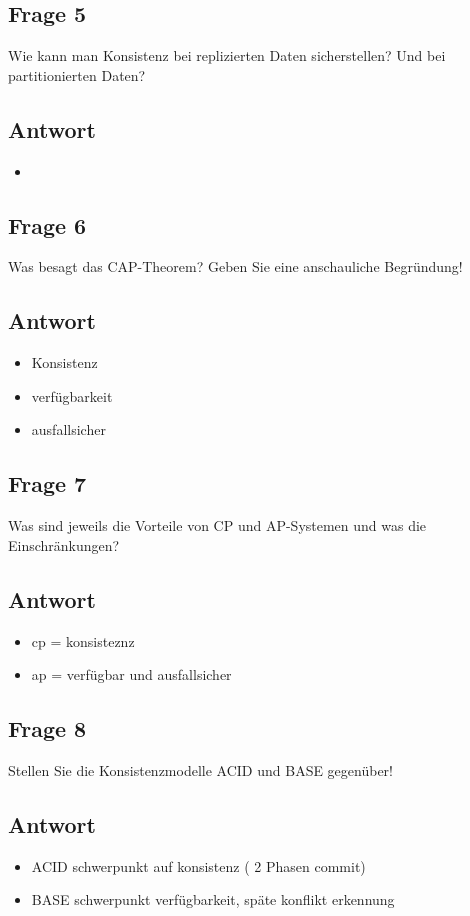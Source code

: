 \subsection*{Frage 5}
Wie kann man Konsistenz bei replizierten Daten sicherstellen? Und bei partitionierten Daten?
\subsection*{Antwort}
\begin{itemize}
	\item 
\end{itemize}
\subsection*{Frage 6}
Was besagt das CAP-Theorem? Geben Sie eine anschauliche Begründung!
\subsection*{Antwort}
\begin{itemize}
	\item Konsistenz
	\item verfügbarkeit
	\item ausfallsicher
\end{itemize}
\subsection*{Frage 7}
Was sind jeweils die Vorteile von CP und AP-Systemen und was die Einschränkungen?
\subsection*{Antwort}
\begin{itemize}
	\item cp = konsisteznz
	\item ap = verfügbar und ausfallsicher
\end{itemize}
\subsection*{Frage 8}
Stellen Sie die Konsistenzmodelle ACID und BASE gegenüber!
\subsection*{Antwort}
\begin{itemize}
	\item ACID schwerpunkt auf konsistenz ( 2 Phasen commit)
	\item BASE schwerpunkt verfügbarkeit,  späte konflikt erkennung
\end{itemize}